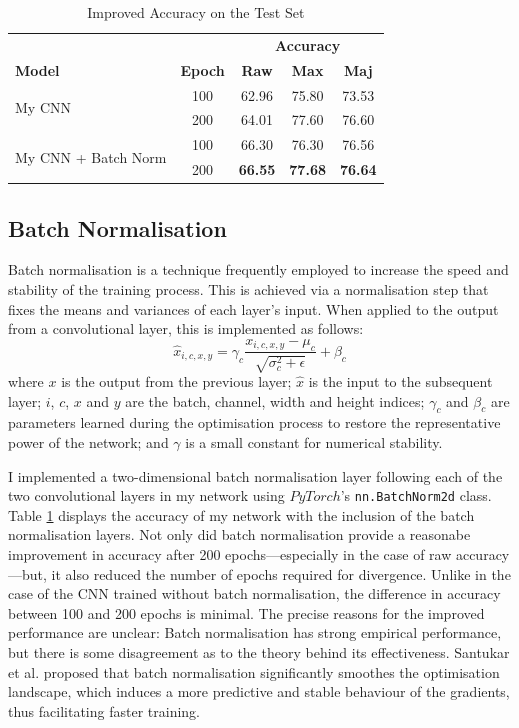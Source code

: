\documentclass[conference]{IEEEtran}
\begin{document}
\begin{table}[htbp]
    \caption{Improved Accuracy on the Test Set}
    \begin{center}
    \begin{tabular}{l c c c c}
    \toprule
    &&\multicolumn{3}{c}{\textbf{Accuracy}}\\
    \cmidrule(lr){3-5}
    \textbf{Model}&\textbf{Epoch}&\textbf{Raw}&\textbf{Max}&\textbf{Maj}\\
    \midrule
    \multirow{ 2}{*}{My CNN} & 100 & 62.96 & 75.80 & 73.53 \\
    & 200 & 64.01 & 77.60 & 76.60 \\
    \midrule
    \multirow{ 2}{*}{My CNN + Batch Norm} & 100 & 66.30 & 76.30 & 76.56 \\
    & 200 & \textbf{66.55} & \textbf{77.68} & \textbf{76.64} \\
    \bottomrule
    \end{tabular}
    \label{improved_results}
    \end{center}
\end{table}

\subsection{Batch Normalisation}

Batch normalisation \cite{IoffeSzegedy} is a technique frequently employed to increase the speed and stability of the training process.
This is achieved via a normalisation step that fixes the means and variances of each layer's input.
When applied to the output from a convolutional layer, this is implemented as follows:
\[
\hat{x}_{i,c,x,y}=\gamma_c\frac{x_{i,c,x,y}-\mu_c}{\sqrt{\sigma_c^2+\epsilon}}+\beta_c
\]
where $x$ is the output from the previous layer; $\hat{x}$ is the input to the subsequent layer; $i$, $c$, $x$ and $y$ are the batch, channel, width and height indices; $\gamma_c$ and $\beta_c$ are parameters learned during the optimisation process to restore the representative power of the network; and $\gamma$ is a small constant for numerical stability.

I implemented a two-dimensional batch normalisation layer following each of the two convolutional layers in my network using $PyTorch$'s \texttt{nn.BatchNorm2d} class.
Table \ref{improved_results} displays the accuracy of my network with the inclusion of the batch normalisation layers.
Not only did batch normalisation provide a reasonabe improvement in accuracy after 200 epochs---especially in the case of raw accuracy---but, it also reduced the number of epochs required for divergence.
Unlike in the case of the CNN trained without batch normalisation, the difference in accuracy between 100 and 200 epochs is minimal.
The precise reasons for the improved performance are unclear: Batch normalisation has strong empirical performance, but there is some disagreement as to the theory behind its effectiveness.
Santukar et al. \cite{SanturkarEtAl} proposed that batch normalisation significantly smoothes the optimisation landscape, which induces a more predictive and stable behaviour of the gradients, thus facilitating faster training.
\end{document}
